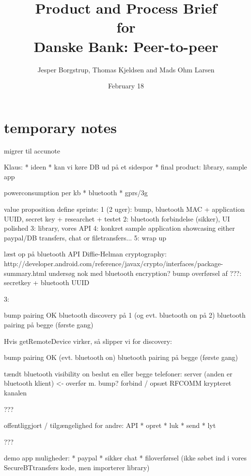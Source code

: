 \documentclass[a4paper,11pt]{article}
\title{Product and Process Brief\\\small{for}\\\small{Danske Bank: Peer-to-peer}}
\author{ Jesper Borgstrup, Thomas Kjeldsen and Mads Ohm Larsen }
\date{February 18}
\begin{document}
\ifpdf
{}
\else
{}
\fi

\maketitle

\tableofcontents
\vspace{2cm}

\section{temporary notes}

migrer til accunote

Klaus:
* ideen
* kan vi køre DB ud på et sidespor
* final product: library, sample app



powerconsumption per kb
* bluetooth
* gprs/3g

value proposition
define sprints:
1 (2 uger): bump, bluetooth MAC + application UUID, secret key + researchet + testet
2: bluetooth forbindelse (sikker), UI polished
3: library, vores API
4: konkret sample application showcasing either paypal/DB transfers, chat or filetransfers...
5: wrap up

læst op på bluetooth API
Diffie-Helman cryptography: http://developer.android.com/reference/javax/crypto/interfaces/package-summary.html
undersøg nok med bluetooth encryption?
bump overførsel af ???: secretkey + bluetooth UUID


3:

bump pairing OK
bluetooth discovery på 1 (og evt. bluetooth on på 2)
bluetooth pairing på begge (første gang)


Hvis getRemoteDevice virker, så slipper vi for discovery:

bump pairing OK
(evt. bluetooth on)
bluetooth pairing på begge (første gang)


tændt bluetooth
visibility on
beslut en eller begge telefoner: server (anden er bluetooth klient) <- overfør m. bump?
forbind / opsæt RFCOMM
krypteret kanalen

???

offentliggjort / tilgængelighed for andre: API
* opret
* luk
* send
* lyt

???

demo app muligheder:
* paypal
* sikker chat
* filoverførsel
(ikke søbet ind i vores SecureBTtransfers kode, men importerer library)
\end{document}
